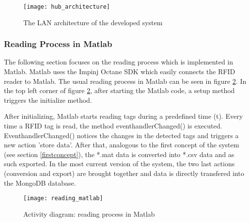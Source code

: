 \begin{figure}
\centering
\texttt{[image: hub\_architecture]} 
\caption{\label{fig:hub_architecture}The LAN architecture of the developed system} 
\end{figure}

\subsubsection{Reading Process in Matlab}

The following section focuses on the reading process which is implemented in Matlab. Matlab uses the Impinj Octane SDK \cite{octanesdk} which easily connects the RFID reader to Matlab. The usual reading process in Matlab can be seen in figure \ref{fig:reading_matlab}. In the top left corner of figure \ref{fig:reading_matlab}, after starting the Matlab code, a setup method triggers the initialize method. 

After initializing, Matlab starts reading tags during a predefined time (t). Every time a RFID tag is read, the method eventhandlerChanged() is executed. EventhandlerChanged() notices the changes in the detected tags and triggers a new action 'store data'. After that, analogous to the first concept of the system (see section \ref{firstconcept}), the *.mat data is converted into *.csv data and as such exported. In the most current version of the system, the two last actions (conversion and export) are brought together and data is directly transfered into the MongoDB database. 

\begin{figure}
\centering
\texttt{[image: reading\_matlab]} 
\caption{\label{fig:reading_matlab}Activity diagram: reading process in Matlab} 
\end{figure}